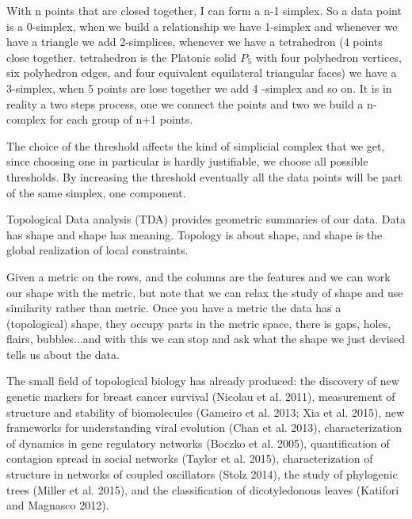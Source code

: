 \documentclass[onecollarge,runningheads]{svjour2}
\begin{document}
With n points that are closed together, I can form a n-1 simplex. So a data point is a 0-simplex, when we build a relationship we have 1-simplex and whenever we have a triangle we add 2-simplices, whenever we have a tetrahedron (4 points close together.  tetrahedron is the Platonic solid $P_5$ with four polyhedron vertices, six polyhedron edges, and four equivalent equilateral triangular faces) we have a 3-simplex, when 5 points are lose together we add 4 -simplex and so on.
It is in reality a two steps process, one we connect the points and two we build a n-complex for each group of n+1 points.

The choice of the threshold affects the kind of simplicial complex that we get, since choosing one in particular is hardly justifiable, we choose all possible thresholds. By increasing the threshold eventually all the data points will be part of the same simplex, one component.

Topological Data analysis (TDA) provides geometric summaries of our data. Data has shape and shape has meaning.
Topology is about shape, and shape is the global realization of local constraints. %

Given a metric on the rows, and the columns are the features and we can work our shape with the metric, but note that we can relax the study of shape and use similarity rather than metric.
Once you have a metric the data has a (topological) shape, they occupy parts in the metric space, there is gaps, holes, flairs, bubbles...and with this we can stop and ask what the shape we just devised tells us about the data.

The small field of topological biology has already produced: the discovery of new genetic markers for breast cancer survival (Nicolau et al. 2011), measurement of structure and stability of biomolecules (Gameiro et al. 2013; Xia et al. 2015), new frameworks for understanding viral evolution (Chan et al. 2013), characterization of dynamics in gene regulatory networks (Boczko et al. 2005), quantification of contagion spread in social networks (Taylor et al. 2015), characterization of structure in networks of coupled oscillators (Stolz 2014), the study of phylogenic trees (Miller et al. 2015), and the classification of dicotyledonous leaves (Katifori and Magnasco 2012).
\end{document}
